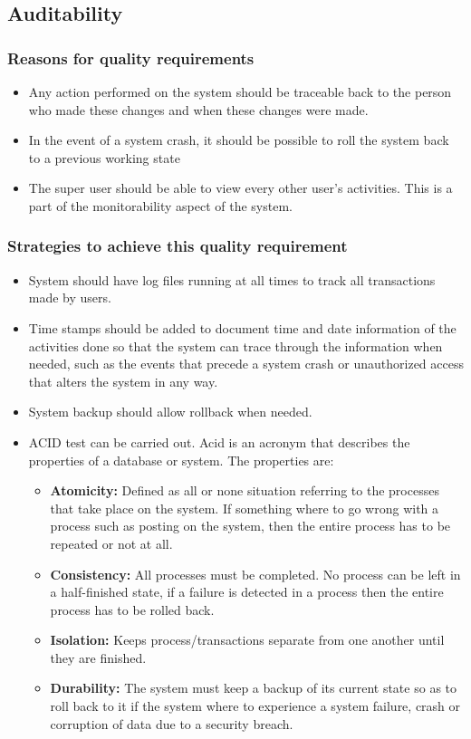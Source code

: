 \documentclass[a4paper,12pt]{article}
\begin{document}
 \subsection{Auditability}
 \subsubsection{Reasons for quality requirements}
 \begin{itemize}
 \item Any action performed on the system should be traceable back to the person who made these changes and when these changes were made.
 \item In the event of a system crash, it should be possible to roll the system back to a previous working state
 \item The super user should be able to view every other user's activities. This is a part of the monitorability aspect of the system.
 \end{itemize}
 \subsubsection{Strategies to achieve this quality requirement}
 \begin{itemize}
 \item System should have log files running at all times to track all transactions made by users. 
 \item Time stamps should be added to document time and date information of the activities done so that the system can trace through the
information when needed, such as the events that precede a system crash or unauthorized access
that alters the system in any way.
\item System backup should allow rollback when needed.
\item ACID test can be carried out. Acid is an acronym that describes the properties of a database or system. The properties are:
	\begin{itemize}
	\item \textbf{Atomicity:} Defined as all or none situation referring to the processes that take place on the 
	   system. If something where to go wrong with a process such as posting on the system,
	   then the entire process has to be repeated or not at all.
	\item \textbf{Consistency:} All processes must be completed. No process can be left in a half-finished state,
	     if a failure is detected in a process then the entire process has to be rolled back.
	\item \textbf{Isolation:} Keeps process/transactions separate from one another until they are finished.
	\item \textbf{Durability:} The system must keep a backup of its current state so as to roll back to it if
	    the system where to experience a system failure, crash or corruption of data due
	    to a security breach.
	\end{itemize}
 \end{itemize}
\end{document}
